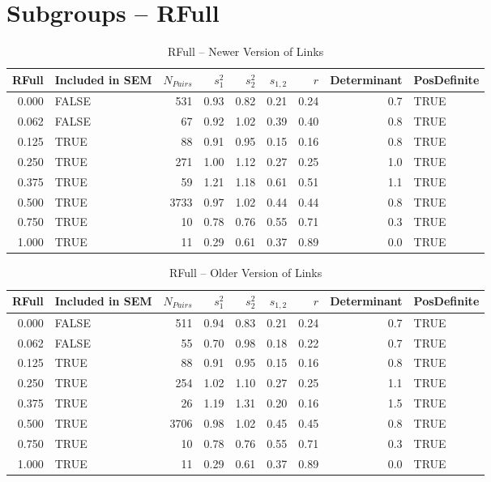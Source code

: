 \documentclass{article}\usepackage{graphicx, color}
\begin{document}
\section{Subgroups --  RFull }%
\begin{table}[ht]
\centering
\begin{tabular}{rlrrrrrrl}
  \hline
RFull & Included in SEM & $N_{Pairs}$ & $s_1^2$ & $s_2^2$ & $s_{1,2}$ & $r$ & Determinant & PosDefinite \\ 
  \hline
0.000 & FALSE & 531 & 0.93 & 0.82 & 0.21 & 0.24 & 0.7 & TRUE \\ 
  0.062 & FALSE & 67 & 0.92 & 1.02 & 0.39 & 0.40 & 0.8 & TRUE \\ 
  0.125 & TRUE & 88 & 0.91 & 0.95 & 0.15 & 0.16 & 0.8 & TRUE \\ 
  0.250 & TRUE & 271 & 1.00 & 1.12 & 0.27 & 0.25 & 1.0 & TRUE \\ 
  0.375 & TRUE & 59 & 1.21 & 1.18 & 0.61 & 0.51 & 1.1 & TRUE \\ 
  0.500 & TRUE & 3733 & 0.97 & 1.02 & 0.44 & 0.44 & 0.8 & TRUE \\ 
  0.750 & TRUE & 10 & 0.78 & 0.76 & 0.55 & 0.71 & 0.3 & TRUE \\ 
  1.000 & TRUE & 11 & 0.29 & 0.61 & 0.37 & 0.89 & 0.0 & TRUE \\ 
   \hline
\end{tabular}
\caption{RFull -- Newer Version of Links} 
\end{table}
\begin{table}[ht]
\centering
\begin{tabular}{rlrrrrrrl}
  \hline
RFull & Included in SEM & $N_{Pairs}$ & $s_1^2$ & $s_2^2$ & $s_{1,2}$ & $r$ & Determinant & PosDefinite \\ 
  \hline
0.000 & FALSE & 511 & 0.94 & 0.83 & 0.21 & 0.24 & 0.7 & TRUE \\ 
  0.062 & FALSE & 55 & 0.70 & 0.98 & 0.18 & 0.22 & 0.7 & TRUE \\ 
  0.125 & TRUE & 88 & 0.91 & 0.95 & 0.15 & 0.16 & 0.8 & TRUE \\ 
  0.250 & TRUE & 254 & 1.02 & 1.10 & 0.27 & 0.25 & 1.1 & TRUE \\ 
  0.375 & TRUE & 26 & 1.19 & 1.31 & 0.20 & 0.16 & 1.5 & TRUE \\ 
  0.500 & TRUE & 3706 & 0.98 & 1.02 & 0.45 & 0.45 & 0.8 & TRUE \\ 
  0.750 & TRUE & 10 & 0.78 & 0.76 & 0.55 & 0.71 & 0.3 & TRUE \\ 
  1.000 & TRUE & 11 & 0.29 & 0.61 & 0.37 & 0.89 & 0.0 & TRUE \\ 
   \hline
\end{tabular}
\caption{RFull -- Older Version of Links} 
\end{table}
\end{document}
